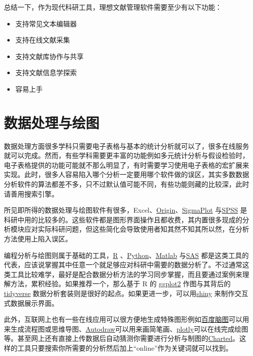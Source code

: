 \documentclass[]{tufte-book}
\providecommand{\tightlist}{%
  \setlength{\itemsep}{0pt}\setlength{\parskip}{0pt}}
\begin{document}
总结一下，作为现代科研工具，理想文献管理软件需要至少有以下功能：

\begin{itemize}
\tightlist
\item
  支持常见文本编辑器
\item
  支持在线文献采集
\item
  支持文献库协作与共享
\item
  支持文献信息学探索
\item
  容易上手
\end{itemize}

\hypertarget{ux6570ux636eux5904ux7406ux4e0eux7ed8ux56fe}{%
\section*{数据处理与绘图}\label{ux6570ux636eux5904ux7406ux4e0eux7ed8ux56fe}}

数据处理方面很多学科只需要电子表格与基本的统计分析就可以了，很多在线服务就可以完成。然而，有些学科需要更丰富的功能例如多元统计分析与假设检验时，电子表格提供的功能可能就不那么明显了，有时需要学习使用电子表格的宏扩展来实现。此时，很多人容易陷入哪个分析一定要用哪个软件做的误区，其实多数数据分析软件的算法都差不多，只不过默认值可能不同，有些功能则藏的比较深，此时请善用搜索引擎。

所见即所得的数据处理与绘图软件有很多，Excel、\href{https://www.originlab.com/}{Origin}、\href{https://systatsoftware.com/}{SigmaPlot} 与\href{https://www.ibm.com/analytics/spss-statistics-software}{SPSS} 是科研中用的比较多的。这些软件都是图形界面操作且都收费，其内置很多现成的分析模块应对实际科研问题，但这些简化会导致使用者知其然不知其所以然，在分析方法使用上陷入误区。

编程分析与绘图则属于基础的工具，\href{https://www.r-project.org/}{R} 、\href{https://www.python.org/}{Python}、\href{https://www.mathworks.com/products/matlab.html}{Matlab} 与\href{https://www.sas.com/en_us/home.html}{SAS} 都是这类工具的代表，应该说掌握其中任意一个就足够应对科研中需要的数据分析了。不过通常这类工具比较难学，最好是配合数据分析方法的学习同步掌握，而且要通过案例来理解方法，累积经验。如果推荐一个，那么基于 R 的 \href{https://ggplot2.tidyverse.org/}{ggplot2} 作图与其背后的 \href{https://www.tidyverse.org/}{tidyverse} 数据分析套装则是很好的起点。如果更进一步，可以用\href{https://www.rstudio.com/products/shiny/}{shiny} 来制作交互式数据展示界面。

此外，互联网上也有一些在线应用可以很方便地生成特殊图形例如\href{http://naotu.baidu.com/}{百度脑图}可以用来生成流程图或思维导图、\href{https://www.autodraw.com/}{Autodraw}可以用来画简笔画、\href{https://plot.ly/}{plotly}可以在线完成绘图等。甚至网上还有直接上传数据后自动猜测你需要进行分析与制图的\href{https://www.charted.co/}{Charted}。这样的工具只要搜索你所需要的分析然后加上``online''作为关键词就可以找到。
\end{document}
